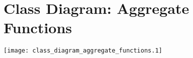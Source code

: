 \section{Class Diagram: Aggregate Functions}
\texttt{[image: class\_diagram\_aggregate\_functions.1]} 